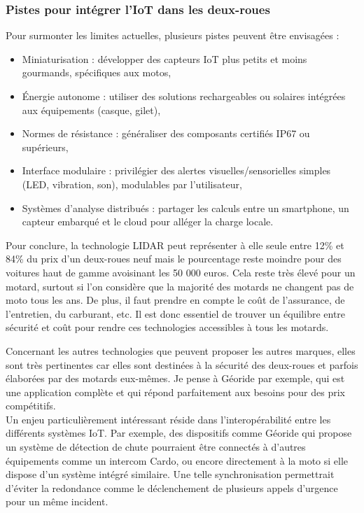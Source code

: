 \subsubsection{Pistes pour intégrer l’IoT dans les deux-roues}
Pour surmonter les limites actuelles, plusieurs pistes peuvent être envisagées : 
\begin{itemize}
  \item Miniaturisation : développer des capteurs IoT plus petits et moins gourmands, spécifiques aux motos,
  \item Énergie autonome : utiliser des solutions rechargeables ou solaires intégrées aux équipements (casque, gilet),
  \item Normes de résistance : généraliser des composants certifiés IP67 ou supérieurs,
  \item Interface modulaire : privilégier des alertes visuelles/sensorielles simples (LED, vibration, son), modulables par l’utilisateur,
  \item Systèmes d’analyse distribués : partager les calculs entre un smartphone, un capteur embarqué et le cloud pour alléger la charge locale.
\end{itemize}
\vspace{0.5cm}

Pour conclure, la technologie LIDAR peut représenter à elle seule entre 12\% et 84\% du prix d'un deux-roues neuf mais le pourcentage reste moindre pour des voitures haut de gamme avoisinant les 50 000 euros. Cela reste très élevé pour un motard, surtout si l'on considère que la majorité des motards ne changent pas de moto tous les ans. De plus, il faut prendre en compte le coût de l'assurance, de l'entretien, du carburant, etc. Il est donc essentiel de trouver un équilibre entre sécurité et coût pour rendre ces technologies accessibles à tous les motards.

Concernant les autres technologies que peuvent proposer les autres marques, elles sont très pertinentes car elles sont destinées à la sécurité des deux-roues et parfois élaborées par des motards eux-mêmes. Je pense à Géoride par exemple, qui est une application complète et qui répond parfaitement aux besoins pour des prix compétitifs.\\
Un enjeu particulièrement intéressant réside dans l’interopérabilité entre les différents systèmes IoT. Par exemple, des dispositifs comme Géoride qui propose un système de détection de chute pourraient être connectés à d’autres équipements comme un intercom Cardo, ou encore directement à la moto si elle dispose d’un système intégré similaire. Une telle synchronisation permettrait d’éviter la redondance comme le déclenchement de plusieurs appels d’urgence pour un même incident.

